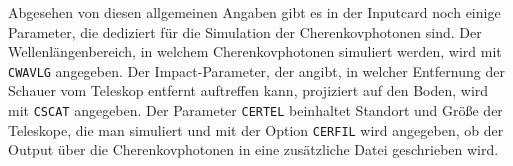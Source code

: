 Abgesehen von diesen allgemeinen Angaben gibt es in der Inputcard noch einige Parameter, die dediziert für die Simulation der Cherenkovphotonen sind.
Der Wellenlängenbereich, in welchem Cherenkovphotonen simuliert werden, wird mit \texttt{CWAVLG} angegeben.
Der Impact-Parameter, der angibt, in welcher Entfernung der Schauer vom Teleskop entfernt auftreffen kann, projiziert auf den Boden, wird mit \texttt{CSCAT} angegeben.
Der Parameter \texttt{CERTEL} beinhaltet Standort und Größe der Teleskope, die man simuliert und mit der Option \texttt{CERFIL} wird angegeben, ob der Output über die Cherenkovphotonen in eine zusätzliche Datei geschrieben wird.


% 
% 
